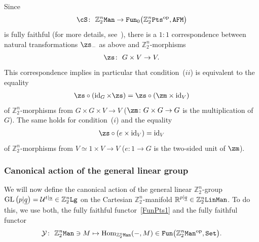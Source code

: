 \documentclass[pdftex]{sigma}%
\newcommand{\op}[1]{\operatorname{#1}}
\newcommand{\R}{{\mathbb R}}
\newcommand{\Z}{{\mathbb Z}}
\def\ul{\underline}
\def\ul{\underline}
\newcommand{\0}{\otimes}
\newcommand{\id}{\op{id}}
\newcommand{\z}{\Z_2^n}
\numberwithin{equation}{section}
\begin{document}
Since
\begin{gather}\label{FunPts1}
\cS\colon\ \z{\tt Man}\to{\tt Fun}_0\big(\z{\tt Pts}^{\op{op}},{\tt AFM}\big)
\end{gather}
is fully faithful (for more details, see~\cite{Bruce:2019b,Bruce:2018,Bruce:2019}), there is a $1:1$ correspondence between natural transformations $\zs_-$ as above and $\z$-morphisms
\[%
\zs\colon\ G\times V\to V.
\]
This correspondence implies in particular that condition~($ii$) is equivalent to the equality
\begin{gather}\label{Act1}
\zs\circ(\id_G\times\zs)=\zs\circ(\zm\times\id_V)
\end{gather}
of $\z$-morphisms from $G\times G\times V\to V$ ($\zm\colon G\times G\to G$ is the multiplication of $G$). The same holds for condition~($i$) and the equality
\begin{gather}\label{Act2}
\zs\circ(e\times \id_V)=\id_V
\end{gather}
of $\z$-morphisms from $V\simeq 1\times V\to V$ ($e\colon 1\to G$ is the two-sided unit of $\zm$).

\subsubsection{Canonical action of the general linear group} We will now define the canonical action of the general linear $\z$-group $\op{GL}\big(p|\ul q\big)=\mathcal{U}^{t|\ul u}\in\z{\tt Lg}$ on the Cartesian $\z$-manifold $\R^{p|\ul q}\in\z{\tt LinMan}$. To do this, we use both, the fully faithful functor~\eqref{FunPts1} and the fully faithful functor
\begin{gather}\label{FunPts2}
\mathcal{Y}\colon\ \z{\tt Man}\ni M\mapsto\op{Hom}_{\z{\tt Man}}(-,M)\in{\tt Fun}\big(\z{\tt Man}^{\op{op}},{\tt Set}\big).
\end{gather}
\end{document}
